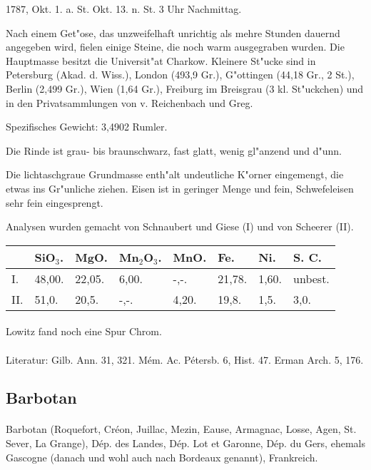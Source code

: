 \documentclass[a4paper, 11pt, oneside]{article}
\begin{document}
1787, Okt. 1. a. St. Okt. 13. n. St. 3 Uhr Nachmittag.

Nach einem Get"ose, das unzweifelhaft unrichtig als mehre Stunden dauernd angegeben wird, fielen einige Steine, die noch warm ausgegraben wurden. Die Hauptmasse besitzt die Universit"at Charkow. Kleinere St"ucke sind in Petersburg (Akad. d. Wiss.), London (493,9 Gr.), G"ottingen (44,18 Gr., 2 St.), Berlin (2,499 Gr.), Wien (1,64 Gr.), Freiburg im Breisgrau (3 kl. St"uckchen) und in den Privatsammlungen von v. Reichenbach und Greg.

Spezifisches Gewicht: 3,4902 Rumler.

Die Rinde ist grau- bis braunschwarz, fast glatt, wenig gl"anzend und d"unn.

Die lichtaschgraue Grundmasse enth"alt undeutliche K"orner eingemengt, die etwas ins Gr"unliche ziehen. Eisen ist in geringer Menge und fein, Schwefeleisen sehr fein eingesprengt.

Analysen wurden gemacht von Schnaubert und Giese (I) und von Scheerer (II).
\begin{table}[!ht]
    \centering
    \begin{tabular}{l l l l l l l l}
         & SiO$_{3}$. & MgO. & Mn$_{2}$O$_{3}$. & MnO. & Fe. & Ni. & S. C. \\ \hline
        I. & 48,00. & 22,05. & 6,00. & -,-. & 21,78. & 1,60. & unbest. \\
        II. & 51,0. & 20,5. & -,-. & 4,20. & 19,8. & 1,5. & 3,0. \\
    \end{tabular}
\end{table}
\paragraph{}
Lowitz fand noch eine Spur Chrom.
\footnotesize
\paragraph{}
Literatur: Gilb. Ann. 31, 321. Mém. Ac. Pétersb. 6, Hist. 47. Erman Arch. 5, 176.
\subsection{Barbotan}
\normalsize
\paragraph{}
Barbotan (Roquefort, Créon, Juillac, Mezin, Eause, Armagnac, Losse, Agen, St. Sever, La Grange), Dép. des Landes, Dép. Lot et Garonne, Dép. du Gers, ehemals Gascogne (danach und wohl auch nach Bordeaux genannt), Frankreich.
\end{document}

